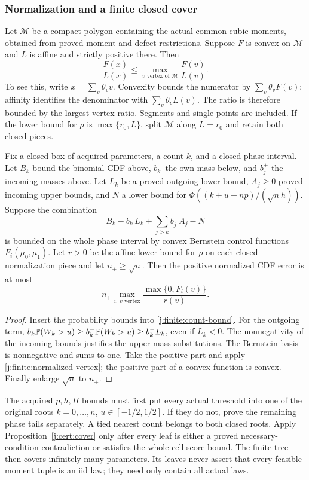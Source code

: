 \subsubsection{Normalization and a finite closed cover}
Let $\mathcal M$ be a compact polygon containing the actual common
cubic moments, obtained from proved moment and defect restrictions.
Suppose $F$ is convex on $\mathcal M$ and $L$ is affine and strictly
positive there. Then
\begin{equation}\label{j:finite:normalized-vertex}
 \frac{F(x)}{L(x)}\le
 \max_{v\text{ vertex of }\mathcal M}\frac{F(v)}{L(v)}.
\end{equation}
To see this, write $x=\sum_v\theta_vv$. Convexity bounds the numerator
by $\sum_v\theta_vF(v)$; affinity identifies the denominator with
$\sum_v\theta_vL(v)$. The ratio is therefore bounded by the largest
vertex ratio. Segments and single points are included. If the lower
bound for $\rho$ is $\max\{r_0,L\}$, split $\mathcal M$ along
$L=r_0$ and retain both closed pieces.

\begin{proposition}\label{j:finite:count-cell}
Fix a closed box of acquired parameters, a count $k$, and a closed
phase interval. Let $B_k$ bound the binomial CDF above, $b_k^-$ the own
mass below, and $b_j^+$ the incoming masses above. Let $L_k$ be a
proved outgoing lower bound, $A_j\ge0$ proved incoming upper bounds,
and $N$ a lower bound for $\Phi((k+u-np)/(\sqrt n h))$.
Suppose the combination
\[
 B_k-b_k^-L_k+\sum_{j>k}b_j^+A_j-N
\]
is bounded on the whole phase interval by convex Bernstein control
functions $F_i(\mu_0,\mu_1)$. Let $r>0$ be the affine lower bound for
$\rho$ on each closed normalization piece and let $n_+\ge\sqrt n$.
Then the positive normalized CDF error is at most
\[
 n_+\max_{i,\,v\text{ vertex}}
       \frac{\max\{0,F_i(v)\}}{r(v)}.
\]
\end{proposition}
\begin{proof}
Insert the probability bounds into \eqref{j:finite:count-bound}. For the outgoing
term, $b_k\mathbb P(W_k>u)\ge b_k^-\mathbb P(W_k>u)\ge b_k^-L_k$,
even if $L_k<0$. The nonnegativity of the incoming bounds justifies the
upper mass substitutions. The Bernstein basis is nonnegative and sums
to one. Take the positive part and apply \eqref{j:finite:normalized-vertex};
the positive part of a convex function is convex. Finally enlarge
$\sqrt n$ to $n_+$.
\end{proof}

The acquired $p,h,H$ bounds must first put every actual threshold into
one of the original roots $k=0,\ldots,n$, $u\in[-1/2,1/2]$.
If they do not, prove the remaining phase tails separately. A tied
nearest count belongs to both closed roots. Apply
Proposition~\ref{j:cert:cover} only after every leaf is either a
proved necessary-condition contradiction or satisfies the whole-cell
score bound. The finite tree then covers infinitely many parameters.
Its leaves never assert that every feasible moment tuple is an iid law;
they need only contain all actual laws.


